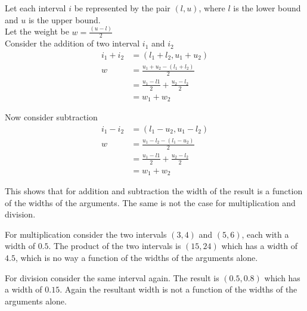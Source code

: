 \documentclass[a4paper,12pt]{article}
\begin{document}
Let each interval $i$ be represented by the pair $(l, u)$, where $l$ is the lower bound and $u$ is the upper bound. \\

Let the weight be $w = \frac{(u-l)}{2}$ \\

Consider the addition of two interval $i_1$ and $i_2$
\begin{align}
i_1+i_2 &= (l_1+l_2, u_1+u_2) \\
w & = \frac{u_1 + u_2 - (l_1 + l_2)}{2} \\ 
  & = \frac{u_1 - l1}{2} + \frac{u_2 - l_2}{2} \\
  & = w_1 + w_2
\end{align}

Now consider subtraction
\begin{align}
i_1-i_2 &= (l_1-u_2, u_1-l_2) \\
w & = \frac{u_1 - l_2 - (l_1 - u_2)}{2} \\ 
  & = \frac{u_1 - l1}{2} + \frac{u_2 - l_2}{2} \\
  & = w_1 + w_2
\end{align}

This shows that for addition and subtraction the width of the result is a function of the widths of the arguments. The same is not the case for multiplication and division. 

For multiplication consider the two intervals $(3, 4)$ and $(5, 6)$, each with a width of $0.5$. The product of the two intervals is $(15, 24)$ which has a width of $4.5$, which is no way a function of the widths of the arguments alone.

For division consider the same interval again. The result is $(0.5, 0.8)$ which has a width of $0.15$. Again the resultant width is not a function of the widths of the arguments alone.
\end{document}
